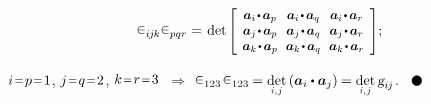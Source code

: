 \begin{otherlanguage}{russian}
\nopagebreak\vspace{-0.2em}\begin{equation*}
\levicivita_{i\hspace{-0.1ex}j\hspace{-0.1ex}k} \levicivita_{pqr} = \hspace{0.25ex}
\operatorname{det}\hspace{-0.1ex}
\scalebox{0.92}[0.92]{$\left[\hspace{-0.16ex}\begin{array}{c@{\hspace{.64em}}c@{\hspace{.64em}}c}
\bm{a}_i \narrowdotp\hspace{.12ex} \bm{a}_p & \bm{a}_i \narrowdotp\hspace{.12ex} \bm{a}_q & \bm{a}_i \narrowdotp\hspace{.12ex} \bm{a}_r \\
\bm{a}_j \narrowdotp\hspace{.12ex} \bm{a}_p & \bm{a}_j \narrowdotp\hspace{.12ex} \bm{a}_q & \bm{a}_j \narrowdotp\hspace{.12ex} \bm{a}_r \\
\bm{a}_k \narrowdotp\hspace{.12ex} \bm{a}_p & \bm{a}_k \narrowdotp\hspace{.12ex} \bm{a}_q & \bm{a}_k \narrowdotp\hspace{.12ex} \bm{a}_r
\end{array}\hspace{-0.12ex}\right]$} ;
\end{equation*}

\vspace{-0.1em} \noindent
${i \narroweq p \narroweq 1}$, ${j \narroweq q \narroweq 2}$, ${k \narroweq r \narroweq 3}$ ${\,\Rightarrow}$ ${\levicivita_{123} \hspace{.2ex} \levicivita_{123} \hspace{-0.12ex} = \underset{\raisebox{.15em}{\scalebox{0.7}{$i$,$\hspace{.15ex}j$}}}{\operatorname{det}} \left( \bm{a}_i \dotp \bm{a}_j \right) \hspace{-0.1ex} = \underset{\raisebox{.15em}{\scalebox{0.7}{$i$,$\hspace{.15ex}j$}}}{\operatorname{det}} \, \textsl{g}_{i\hspace{-0.1ex}j}}$.
${ \hspace{.6em}
\tikz[baseline=-0.6ex] \draw [color=black, fill=black] (0, 0) circle (.8ex); }$


\end{otherlanguage}
